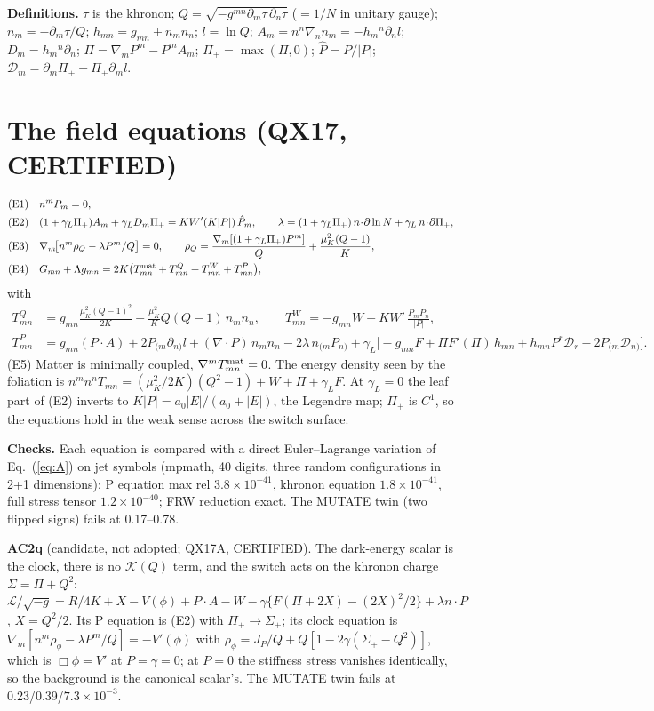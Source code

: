 \documentclass[10pt]{article}
\begin{document}
\textbf{Definitions.} $\tau$ is the khronon; $Q=\sqrt{-g^{mn}\partial_m\tau\,\partial_n\tau}$ ($=1/N$ in unitary gauge); $n_m=-\partial_m\tau/Q$; $h_{mn}=g_{mn}+n_mn_n$; $l=\ln Q$; $A_m=n^n\nabla_nn_m=-h_m{}^n\partial_nl$; $D_m=h_m{}^n\partial_n$; $\Pi=\nabla_mP^m-P^mA_m$; $\Pi_+=\max(\Pi,0)$; $\hat P=P/|P|$; $\mathcal D_m=\partial_m\Pi_+-\Pi_+\partial_ml$.

\section{The field equations (QX17, CERTIFIED)}
\begin{align}
&\text{(E1)}\quad n^mP_m=0,\\
&\text{(E2)}\quad (1+\gamma_L\Pi_+)A_m+\gamma_LD_m\Pi_+=KW'(K|P|)\,\hat P_m,\qquad \lambda=(1+\gamma_L\Pi_+)\,n\!\cdot\!\partial\ln N+\gamma_L\,n\!\cdot\!\partial\Pi_+,\\
&\text{(E3)}\quad \nabla_m\!\big[n^m\rho_Q-\lambda P^m/Q\big]=0,\qquad \rho_Q=\frac{\nabla_m[(1+\gamma_L\Pi_+)P^m]}{Q}+\frac{\mu_K^2(Q-1)}{K},\\
&\text{(E4)}\quad G_{mn}+\Lambda g_{mn}=2K\big(T^{\rm mat}_{mn}+T^Q_{mn}+T^W_{mn}+T^P_{mn}\big),
\end{align}
with
\begin{align*}
T^Q_{mn}&=g_{mn}\frac{\mu_K^2(Q-1)^2}{2K}+\frac{\mu_K^2}{K}Q(Q-1)\,n_mn_n,\qquad T^W_{mn}=-g_{mn}W+KW'\,\frac{P_mP_n}{|P|},\\
T^P_{mn}&=g_{mn}(P\!\cdot\!A)+2P_{(m}\partial_{n)}l+(\nabla\!\cdot\!P)\,n_mn_n-2\lambda\,n_{(m}P_{n)}+\gamma_L\big[-g_{mn}F+\Pi F'(\Pi)\,h_{mn}+h_{mn}P^r\mathcal D_r-2P_{(m}\mathcal D_{n)}\big].
\end{align*}
(E5) Matter is minimally coupled, $\nabla^mT^{\rm mat}_{mn}=0$. The energy density seen by the foliation is
$n^mn^nT_{mn}=(\mu_K^2/2K)(Q^2-1)+W+\Pi+\gamma_LF$.
At $\gamma_L=0$ the leaf part of (E2) inverts to $K|P|=a_0|E|/(a_0+|E|)$, the Legendre map; $\Pi_+$ is $C^1$, so the equations hold in the weak sense across the switch surface.

\textbf{Checks.} Each equation is compared with a direct Euler--Lagrange variation of Eq.~(\ref{eq:A}) on jet symbols (mpmath, 40 digits, three random configurations in 2+1 dimensions): P equation max rel $3.8\times10^{-41}$, khronon equation $1.8\times10^{-41}$, full stress tensor $1.2\times10^{-40}$; FRW reduction exact. The MUTATE twin (two flipped signs) fails at 0.17--0.78.

\textbf{AC2q} (candidate, not adopted; QX17A, CERTIFIED). The dark-energy scalar is the clock, there is no $\mathcal K(Q)$ term, and the switch acts on the khronon charge $\Sigma=\Pi+Q^2$:
$\mathcal L/\sqrt{-g}=R/4K+X-V(\phi)+P\!\cdot\!A-W-\gamma\{F(\Pi+2X)-(2X)^2/2\}+\lambda n\!\cdot\!P$, $X=Q^2/2$.
Its P equation is (E2) with $\Pi_+\to\Sigma_+$; its clock equation is $\nabla_m[n^m\rho_\phi-\lambda P^m/Q]=-V'(\phi)$ with $\rho_\phi=J_P/Q+Q[1-2\gamma(\Sigma_+-Q^2)]$, which is $\Box\phi=V'$ at $P=\gamma=0$; at $P=0$ the stiffness stress vanishes identically, so the background is the canonical scalar's. The MUTATE twin fails at 0.23/0.39/$7.3\times10^{-3}$.
\end{document}
